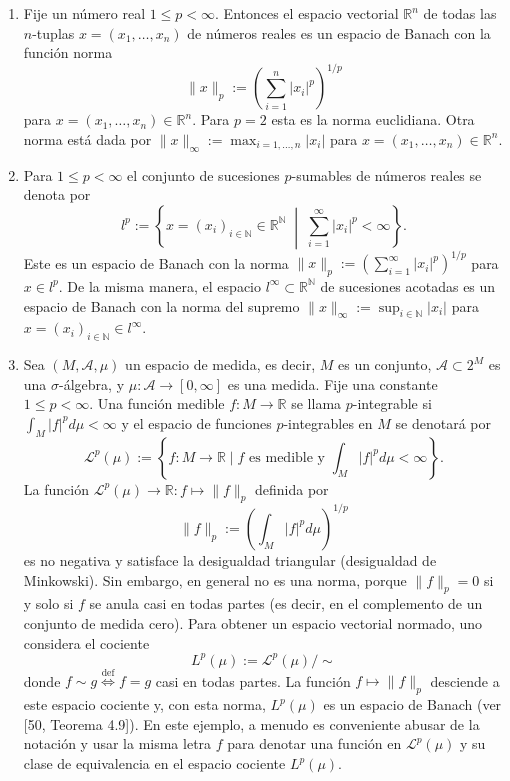 \begin{example} \label{ex:1.3} \hfill
\begin{enumerate}
    \item[(i)] Fije un número real $1\le p<\infty$. Entonces el espacio vectorial $\mathbb{R}^{n}$ de todas las $n$-tuplas $x=(x_{1},\dots,x_{n})$ de números reales es un espacio de Banach con la función norma
    \[ \|x\|_{p} := \left(\sum_{i=1}^{n}|x_{i}|^{p}\right)^{1/p} \]
    para $x=(x_{1},\dots,x_{n})\in\mathbb{R}^{n}$. Para $p=2$ esta es la norma euclidiana. Otra norma está dada por $\|x\|_{\infty} := \max_{i=1,\dots,n}|x_{i}|$ para $x=(x_{1},\dots,x_{n})\in\mathbb{R}^{n}$.
    
    \item[(ii)] Para $1\le p<\infty$ el conjunto de sucesiones $p$-sumables de números reales se denota por
    \[ l^{p} := \left\{x=(x_{i})_{i\in\mathbb{N}}\in\mathbb{R}^{\mathbb{N}} \;\middle|\; \sum_{i=1}^{\infty}|x_{i}|^{p}<\infty\right\}. \]
    Este es un espacio de Banach con la norma $\|x\|_{p} := \left(\sum_{i=1}^{\infty}|x_{i}|^{p}\right)^{1/p}$ para $x\in l^{p}$. De la misma manera, el espacio $l^{\infty}\subset\mathbb{R}^{\mathbb{N}}$ de sucesiones acotadas es un espacio de Banach con la norma del supremo $\|x\|_{\infty} := \sup_{i\in\mathbb{N}}|x_{i}|$ para $x=(x_{i})_{i\in\mathbb{N}}\in l^{\infty}$.
    
    \item[(iii)] Sea $(M,\mathcal{A},\mu)$ un espacio de medida, es decir, $M$ es un conjunto, $\mathcal{A}\subset 2^{M}$ es una $\sigma$-álgebra, y $\mu:\mathcal{A}\rightarrow[0,\infty]$ es una medida. Fije una constante $1\le p<\infty$. Una función medible $f:M\rightarrow\mathbb{R}$ se llama $p$-integrable si $\int_{M}|f|^{p}d\mu<\infty$ y el espacio de funciones $p$-integrables en $M$ se denotará por
    \[ \mathcal{L}^{p}(\mu) := \left\{f:M\rightarrow\mathbb{R} \mid f \text{ es medible y } \int_{M}|f|^{p}d\mu<\infty\right\}. \]
    La función $\mathcal{L}^{p}(\mu)\rightarrow\mathbb{R}:f\mapsto\|f\|_{p}$ definida por
    \begin{equation}\label{eq:1.2}
    \|f\|_{p} := \left(\int_{M}|f|^{p}d\mu\right)^{1/p}
    \end{equation}
    es no negativa y satisface la desigualdad triangular (desigualdad de Minkowski). Sin embargo, en general no es una norma, porque $\|f\|_{p}=0$ si y solo si $f$ se anula casi en todas partes (es decir, en el complemento de un conjunto de medida cero). Para obtener un espacio vectorial normado, uno considera el cociente
    \[ L^{p}(\mu) := \mathcal{L}^{p}(\mu)/{\sim} \]
    donde $f\sim g \stackrel{\text{def}}{\iff} f=g$ casi en todas partes.
    La función $f\mapsto\|f\|_{p}$ desciende a este espacio cociente y, con esta norma, $L^{p}(\mu)$ es un espacio de Banach (ver [50, Teorema 4.9]). En este ejemplo, a menudo es conveniente abusar de la notación y usar la misma letra $f$ para denotar una función en $\mathcal{L}^{p}(\mu)$ y su clase de equivalencia en el espacio cociente $L^{p}(\mu)$.
    

\end{enumerate}
\end{example}
